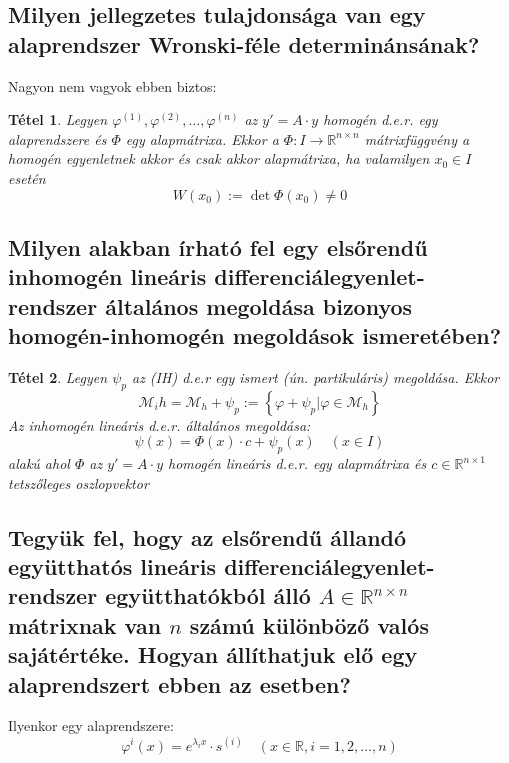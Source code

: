 \documentclass[12pt,a4paper]{article}
\newcommand{\R}{\mathbb{R}}
\newcommand{\CM}{\mathcal{M}}
\newcommand{\f}{\varphi}
\newcommand{\bb}[1]{\left( #1 \right)}
\newcommand{\braces}[1]{\left\lbrace #1 \right\rbrace}
\newtheorem{tet}{Tétel}[section]
\begin{document}
\subsection{Milyen jellegzetes tulajdonsága van egy alaprendszer Wronski-féle determinánsának?}
Nagyon nem vagyok ebben biztos:
\begin{tet}
Legyen $\f^{(1)},\f^{(2)},\ldots,\f^{(n)}$ az $y' = A \cdot y$ homogén d.e.r. egy alaprendszere és $\Phi$ egy alapmátrixa. Ekkor a $\Phi : I \to \R^{n \times n}$ mátrixfüggvény a homogén egyenletnek akkor és csak akkor alapmátrixa, ha valamilyen $x_0 \in I $ esetén 
\[
W(x_0) := \det \Phi(x_0) \neq 0
\]
\end{tet}
\subsection{Milyen alakban írható fel egy elsőrendű inhomogén lineáris differenciálegyenlet-rendszer általános megoldása bizonyos homogén-inhomogén megoldások ismeretében?}
\begin{tet}
Legyen $\psi_p$ az (IH) d.e.r egy ismert (ún. partikuláris) megoldása. Ekkor
\[
\CM_ih = \CM_h + \psi_p := \braces{\f + \psi_p \lvert \f \in \CM_h}
\]
Az inhomogén lineáris d.e.r. általános megoldása:
\[
\psi(x) = \Phi(x) \cdot c + \psi_p(x) \quad \bb{x \in I}
\]
alakú ahol $\Phi$ az $y' = A \cdot y$ homogén lineáris d.e.r. egy alapmátrixa és $c \in \R^{n \times 1 }$ tetszőleges oszlopvektor
\end{tet}

\subsection{Tegyük fel, hogy az elsőrendű állandó együtthatós lineáris differenciálegyenlet-rendszer együtthatókból álló $A \in \R^{n \times n}$ mátrixnak van $n$ számú különböző valós sajátértéke. Hogyan állíthatjuk elő egy alaprendszert ebben az esetben?}
Ilyenkor egy alaprendszere:
\[
\f^{i}(x) = e^{\lambda_{i}x} \cdot s^{(i)} \quad \bb{x \in \R, i = 1,2, \ldots, n}
\]
\end{document}

